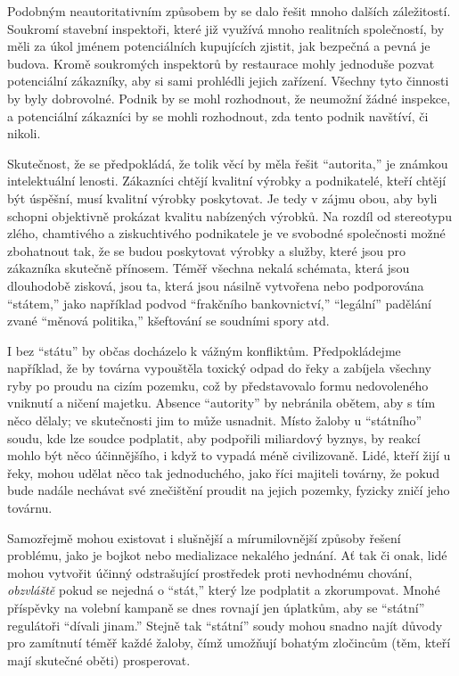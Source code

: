 \documentclass{book}
\begin{document}
Podobným neautoritativním způsobem by se dalo řešit mnoho dalších záležitostí. Soukromí stavební inspektoři, které již využívá mnoho realitních společností, by měli za úkol jménem potenciálních kupujících zjistit, jak bezpečná a pevná je budova. Kromě soukromých inspektorů by restaurace mohly jednoduše pozvat potenciální zákazníky, aby si sami prohlédli jejich zařízení. Všechny tyto činnosti by byly dobrovolné. Podnik by se mohl rozhodnout, že neumožní žádné inspekce, a potenciální zákazníci by se mohli rozhodnout, zda tento podnik navštíví, či nikoli.

Skutečnost, že se předpokládá, že tolik věcí by měla řešit \enquote{autorita,} je známkou intelektuální lenosti. Zákazníci chtějí kvalitní výrobky a podnikatelé, kteří chtějí být úspěšní, musí kvalitní výrobky poskytovat. Je tedy v zájmu obou, aby byli schopni objektivně prokázat kvalitu nabízených výrobků. Na rozdíl od stereotypu zlého, chamtivého a ziskuchtivého podnikatele je ve svobodné společnosti možné zbohatnout tak, že se budou poskytovat výrobky a služby, které jsou pro zákazníka skutečně přínosem. Téměř všechna nekalá schémata, která jsou dlouhodobě zisková, jsou ta, která jsou násilně vytvořena nebo podporována \enquote{státem,} jako například podvod \enquote{frakčního bankovnictví,} \enquote{legální} padělání zvané \enquote{měnová politika,} kšeftování se soudními spory atd.

I bez \enquote{státu} by občas docházelo k vážným konfliktům. Předpokládejme například, že by továrna vypouštěla toxický odpad do řeky a zabíjela všechny ryby po proudu na cizím pozemku, což by představovalo formu nedovoleného vniknutí a ničení majetku. Absence \enquote{autority} by nebránila obětem, aby s tím něco dělaly; ve skutečnosti jim to může usnadnit. Místo žaloby u \enquote{státního} soudu, kde lze soudce podplatit, aby podpořili miliardový byznys, by reakcí mohlo být něco účinnějšího, i když to vypadá méně civilizovaně. Lidé, kteří žijí u řeky, mohou udělat něco tak jednoduchého, jako říci majiteli továrny, že pokud bude nadále nechávat své znečištění proudit na jejich pozemky, fyzicky zničí jeho továrnu.

Samozřejmě mohou existovat i slušnější a mírumilovnější způsoby řešení problému, jako je bojkot nebo medializace nekalého jednání. Ať tak či onak, lidé mohou vytvořit účinný odstrašující prostředek proti nevhodnému chování, \emph{obzvláště} pokud se nejedná o \enquote{stát,} který lze podplatit a zkorumpovat. Mnohé příspěvky na volební kampaně se dnes rovnají jen úplatkům, aby se \enquote{státní} regulátoři \enquote{dívali jinam.} Stejně tak \enquote{státní} soudy mohou snadno najít důvody pro zamítnutí téměř každé žaloby, čímž umožňují bohatým zločincům (těm, kteří mají skutečné oběti) prosperovat.
\end{document}
